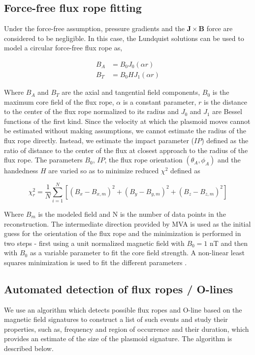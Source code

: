 \subsection{Force-free flux rope fitting}
Under the force-free assumption, pressure gradients and the $\mathbf{J}\times\mathbf{B}$ force are considered to be negligible. In this case, the Lundquist solutions can be used to model a circular force-free flux rope \cite{Lepping1990MagneticAU,Slavin2003GeotailSheet} as, 

\begin{align}
    B_A & = B_0 J_0 \left( \alpha r \right)\\
    B_T & = B_0 H J_1 \left( \alpha r \right)
\end{align}

Where $B_A$ and $B_T$ are the axial and tangential field components, $B_0$ is the maximum core field of the flux rope, $\alpha$ is a constant parameter, $r$ is the distance to the center of the flux rope normalized to its radius and $J_0$ and $J_1$ are Bessel functions of the first kind. Since the velocity at which the plasmoid moves cannot be estimated without making assumptions, we cannot estimate the radius of the flux rope directly. Instead, we estimate the impact parameter ($IP$) defined as the ratio of distance to the center of the flux at closest approach to the radius of the flux rope. The parameters $B_0$, $IP$, the flux rope orientation $(\theta_A, \phi_A)$ and the handedness $H$ are varied so as to minimize reduced $\chi^2$ defined as \cite{Lepping1990MagneticAU}

\begin{equation}
    \chi_r^2 = \frac{1}{N} \sum_{i=1}^{N} \left[ \left(B_x - B_{x,m} \right)^2 + \left(B_y - B_{y,m} \right)^2 + \left(B_z - B_{z,m} \right)^2 \right]
\end{equation}

Where $B_m$ is the modeled field and N is the number of data points in the reconstruction. The intermediate direction provided by MVA is used as the initial guess for the orientation of the flux rope  and the minimization is performed in two steps - first using a unit normalized magnetic field with $B_0=1$ nT and then with $B_0$ as a variable parameter to fit the core field strength. A non-linear least squares minimization is used to fit the different parameters \cite{Newville2018Non-LinearPython}. 

\subsection{Automated detection of flux ropes / O-lines}
\label{subsec:algorithm-fluxrope}
We use an algorithm which detects possible flux ropes and O-line based on the magnetic field signatures to construct a list of such events and study their properties, such as, frequency and region of occurrence and their duration, which provides an estimate of the size of the plasmoid signature. The algorithm is described below. 

